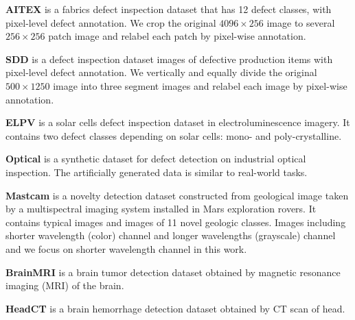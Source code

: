 \documentclass[10pt,twocolumn,letterpaper]{article}
\begin{document}
\textbf{AITEX} \cite{silvestre2019public} is a fabrics defect inspection dataset that has 12 defect classes, with pixel-level defect annotation. We crop the original $4096\times256$ image to several $256\times256$ patch image and relabel each patch by pixel-wise annotation.

\textbf{SDD} \cite{Tabernik2019JIM} is a defect inspection dataset images of defective production items with pixel-level defect annotation. We vertically and equally divide the original $500\times1250$ image into three segment images and relabel each image by pixel-wise annotation.

\textbf{ELPV} \cite{deitsch2019elpv} is a solar cells defect inspection dataset in electroluminescence imagery. It contains two defect classes depending on solar cells: mono- and poly-crystalline.

\textbf{Optical} \cite{wieler2007weakly} is a synthetic dataset for defect detection on industrial optical inspection. The artificially generated data is similar to real-world tasks.

\textbf{Mastcam} \cite{kerner2020comparison} is a novelty detection dataset constructed from geological image taken by a multispectral imaging system installed in Mars exploration rovers. It contains typical images and images of 11 novel geologic classes. Images including shorter wavelength (color) channel and longer wavelengths (grayscale) channel and we focus on shorter wavelength channel in this work.

\textbf{BrainMRI} \cite{salehi2021multiresolution} is a brain tumor detection dataset obtained by magnetic resonance imaging (MRI) of the brain.

\textbf{HeadCT} \cite{salehi2021multiresolution} is a brain hemorrhage detection dataset obtained by CT scan of head.
\end{document}
